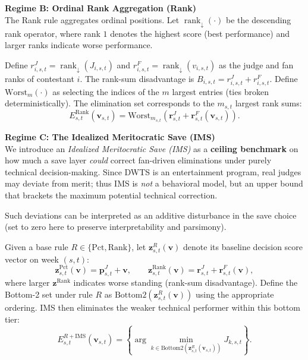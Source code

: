 \noindent\textbf{Regime B: Ordinal Rank Aggregation (Rank)}
\\
The Rank rule aggregates ordinal positions. Let $\operatorname{rank}_{\downarrow}(\cdot)$ be the descending rank operator, where rank $1$ denotes the highest score (best performance) and larger ranks indicate worse performance.

Define $r_{i,s,t}^J=\operatorname{rank}_{\downarrow}(J_{i,s,t})$ and $r_{i,s,t}^F=\operatorname{rank}_{\downarrow}(v_{i,s,t})$ as the judge and fan ranks of contestant $i$. The rank-sum disadvantage is $B_{i,s,t}=r_{i,s,t}^J+r_{i,s,t}^F$. Define $\mathrm{Worst}_{m}(\cdot)$ as selecting the indices of the $m$ largest entries (ties broken deterministically). The elimination set corresponds to the $m_{s,t}$ largest rank sums:
\begin{equation}
    E_{s,t}^{\mathrm{Rank}}(\mathbf{v}_{s,t}) = \mathrm{Worst}_{m_{s,t}}\left( \mathbf{r}_{s,t}^J + \mathbf{r}_{s,t}^F(\mathbf{v}_{s,t}) \right).
\end{equation}



\noindent\textbf{Regime C: The Idealized Meritocratic Save (IMS)}
\\
We introduce an \emph{Idealized Meritocratic Save (IMS)} as a \textbf{ceiling benchmark} on how much a save layer \emph{could} correct fan-driven eliminations under purely technical decision-making. Since DWTS is an entertainment program, real judges may deviate from merit; thus IMS is \emph{not} a behavioral model, but an upper bound that brackets the maximum potential technical correction. 

Such deviations can be interpreted as an additive disturbance in the save choice (set to zero here to preserve interpretability and parsimony).


Given a base rule $R\in\{\mathrm{Pct},\mathrm{Rank}\}$, let $\mathbf z^R_{s,t}(\mathbf v)$ denote its baseline decision score vector on week $(s,t)$:
\[
\mathbf z^{\mathrm{Pct}}_{s,t}(\mathbf v)=\mathbf p^J_{s,t}+\mathbf v,\qquad
\mathbf z^{\mathrm{Rank}}_{s,t}(\mathbf v)=\mathbf r^J_{s,t}+\mathbf r^F_{s,t}(\mathbf v),
\]
where larger $\mathbf z^{\mathrm{Rank}}$ indicates worse standing (rank-sum disadvantage).
Define the Bottom-2 set under rule $R$ as $\mathrm{Bottom2}(\mathbf z^R_{s,t}(\mathbf v))$ using the appropriate ordering. IMS then eliminates the weaker technical performer within this bottom tier:
\begin{equation}
E_{s,t}^{R+\mathrm{IMS}}(\mathbf{v}_{s,t}) =
\left\{ \arg\min_{k \in \mathrm{Bottom2}(\mathbf{z}^R_{s,t}(\mathbf{v}_{s,t}))} J_{k,s,t} \right\}.
\end{equation}


